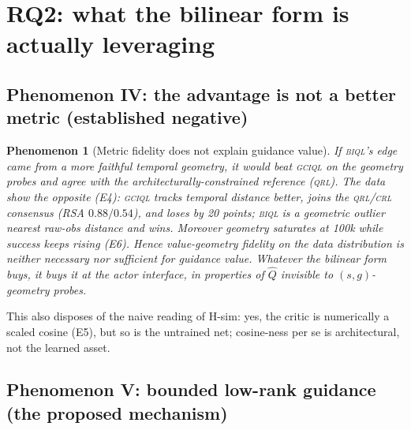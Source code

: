\documentclass[10pt]{article}
\newtheorem{phenomenon}{Phenomenon}
\begin{document}
\section{RQ2: what the bilinear form is actually leveraging}

\subsection{Phenomenon IV: the advantage is not a better metric (established negative)}

\begin{phenomenon}[Metric fidelity does not explain guidance value]\label{ph:notmetric}
If \textsc{biql}'s edge came from a more faithful temporal geometry, it would beat
\textsc{gciql} on the geometry probes and agree with the architecturally-constrained
reference (\textsc{qrl}). The data show the opposite (E4): \textsc{gciql} tracks temporal
distance better, joins the \textsc{qrl}/\textsc{crl} consensus (RSA $0.88/0.54$), and
\emph{loses by 20 points}; \textsc{biql} is a geometric outlier nearest raw-obs distance
and wins. Moreover geometry saturates at 100k while success keeps rising (E6). Hence
value-geometry fidelity on the data distribution is neither necessary nor sufficient for
guidance value. Whatever the bilinear form buys, it buys it \emph{at the actor interface},
in properties of $\hat Q$ invisible to $(s,g)$-geometry probes.
\end{phenomenon}

This also disposes of the naive reading of H-sim: yes, the critic is numerically a scaled
cosine (E5), but so is the untrained net; cosine-ness per se is architectural, not the
learned asset.

\subsection{Phenomenon V: bounded low-rank guidance (the proposed mechanism)}
\end{document}
